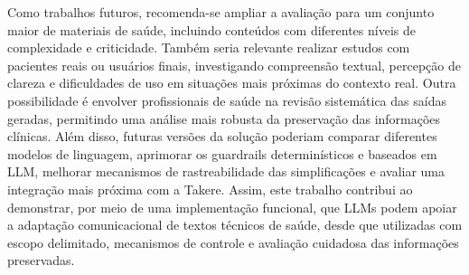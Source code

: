 Como trabalhos futuros, recomenda-se ampliar a avaliação para um conjunto maior de materiais de saúde, incluindo conteúdos com diferentes níveis de complexidade e criticidade. Também seria relevante realizar estudos com pacientes reais ou usuários finais, investigando compreensão textual, percepção de clareza e dificuldades de uso em situações mais próximas do contexto real. Outra possibilidade é envolver profissionais de saúde na revisão sistemática das saídas geradas, permitindo uma análise mais robusta da preservação das informações clínicas. Além disso, futuras versões da solução poderiam comparar diferentes modelos de linguagem, aprimorar os guardrails determinísticos e baseados em LLM, melhorar mecanismos de rastreabilidade das simplificações e avaliar uma integração mais próxima com a Takere. Assim, este trabalho contribui ao demonstrar, por meio de uma implementação funcional, que LLMs podem apoiar a adaptação comunicacional de textos técnicos de saúde, desde que utilizadas com escopo delimitado, mecanismos de controle e avaliação cuidadosa das informações preservadas.
